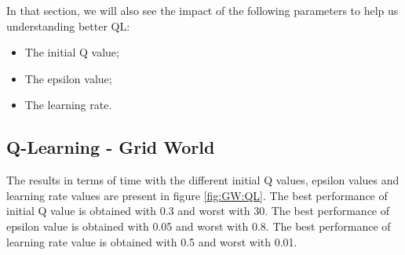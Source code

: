 \documentclass[10pt, twocolumn]{article}
\begin{document}
			In that section, we will also see the impact of the following parameters to help us understanding better QL:
			\begin{itemize}
				\item The initial Q value;
				\item The epsilon value;
				\item The learning rate.
			\end{itemize}
		\subsection{Q-Learning - Grid World}
			The results in terms of time with the different initial Q values, epsilon values and learning rate values are present in figure \ref{fig:GW:QL}. The best performance of initial Q value is obtained with 0.3 and worst with 30. The best performance of epsilon value is obtained with 0.05 and worst with 0.8. The best performance of learning rate value is obtained with 0.5 and worst with 0.01.
\end{document}
